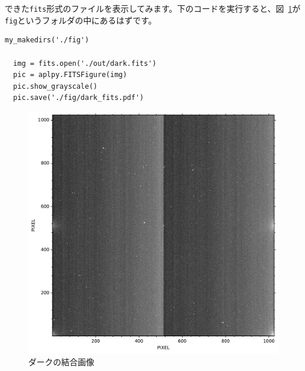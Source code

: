 できた\texttt{fits}形式のファイルを表示してみます。下のコードを実行すると、図~\ref{fig:dark}が\texttt{fig}というフォルダの中にあるはずです。
\begin{lstlisting}[caption=ダーク画像の表示, label=code:dark]
  my_makedirs('./fig')

  img = fits.open('./out/dark.fits')
  pic = aplpy.FITSFigure(img)
  pic.show_grayscale()
  pic.save('./fig/dark_fits.pdf')
\end{lstlisting}
\begin{figure}
  \centering
	\includegraphics[width=0.6\linewidth]{./fig/chap_5/dark_fits.pdf}
	\caption{ダークの結合画像}
  \label{fig:dark}
\end{figure}

